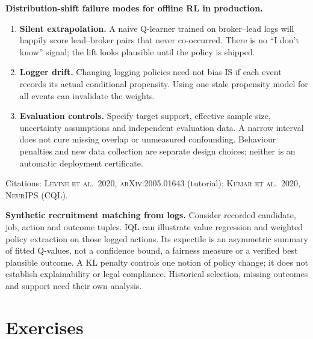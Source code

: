 \documentclass[11pt,oneside]{scrbook}
\begin{document}
\begin{safetyangle}
\textbf{Distribution-shift failure modes for offline RL in production.}
\begin{enumerate}
  \item \textbf{Silent extrapolation.} A naive Q-learner trained on broker--lead logs
        will happily score lead--broker pairs that never co-occurred. There is no
        ``I don't know'' signal; the lift looks plausible until the policy is shipped.
  \item \textbf{Logger drift.} Changing logging policies need not bias IS if
        each event records its actual conditional propensity. Using one stale
        propensity model for all events can invalidate the weights.
  \item \textbf{Evaluation controls.} Specify target support, effective sample
        size, uncertainty assumptions and independent evaluation data. A narrow
        interval does not cure missing overlap or unmeasured confounding.
        Behaviour penalties and new data collection are separate design choices;
        neither is an automatic deployment certificate.

\end{enumerate}
Citations: \textsc{Levine et al.\ 2020, arXiv:2005.01643} (tutorial);
\textsc{Kumar et al.\ 2020, NeurIPS} (CQL).
\end{safetyangle}

\begin{matching}
\textbf{Synthetic recruitment matching from logs.} Consider recorded candidate,
job, action and outcome tuples. IQL can illustrate value regression and
weighted policy extraction on those logged actions. Its expectile is an
asymmetric summary of fitted Q-values, not a confidence bound, a fairness
measure or a verified best plausible outcome. A KL penalty controls one
notion of policy change; it does not establish explainability or legal
compliance. Historical selection, missing outcomes and support need their
own analysis.

\end{matching}

\chapter{Exercises}
\end{document}
